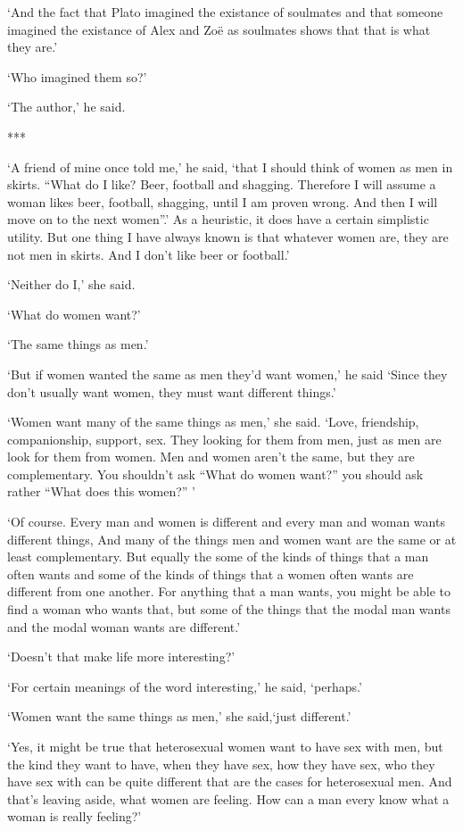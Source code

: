 `And the fact that Plato imagined the existance of soulmates and that someone imagined the existance of Alex and Zoë as soulmates shows that that is what they are.'

`Who imagined them so?'

`The author,' he said.

***

`A friend of mine once told me,' he said, `that I should think of women as men
in skirts. ``What do I like? Beer, football and shagging.
Therefore I will assume a woman likes beer, football, shagging,
until I am proven wrong. And then I will move on to the
next women''.' As a heuristic, it does have a certain simplistic utility. But one thing I have always known is that whatever
women are, they are not men in skirts. And I don't like beer or football.'

`Neither do I,' she said.

`What do women want?'

`The same things as men.'

`But if women wanted the same as men they'd want women,' he said `Since they
don't usually want women, they must want different things.'

`Women want many of the same things as men,' she said. `Love,
friendship, companionship, support, sex. They looking for
them from men, just as men are look for them from women. Men and
women aren't the same, but they are complementary. You
shouldn't ask ``What do women want?'' you should ask rather ``What
does {\twelveit this\/} women?'' '

`Of course. Every man and women is different and every man and woman
wants different things, And many of the things men and women want
are the same or at least complementary. But equally the some of the
kinds of things that a man often wants and some of the kinds of
things that a women often wants are different from one another. For
anything that a man wants, you might be able to find a woman who wants
that, but some of the things that the modal man wants and the modal
woman wants are different.'

`Doesn't that make life more interesting?'

`For certain meanings of the word {\twelveit interesting},' he said, `perhaps.'

`Women want the same things as men,' she said,`just different.'

`Yes, it might be true that heterosexual women want to have sex with
men, but the kind they want to have, when they have sex, how they
have sex, who they have sex with can be quite different that are the
cases for heterosexual men. And that's leaving aside, what women are
feeling. How can a man every know what a woman is really feeling?'

